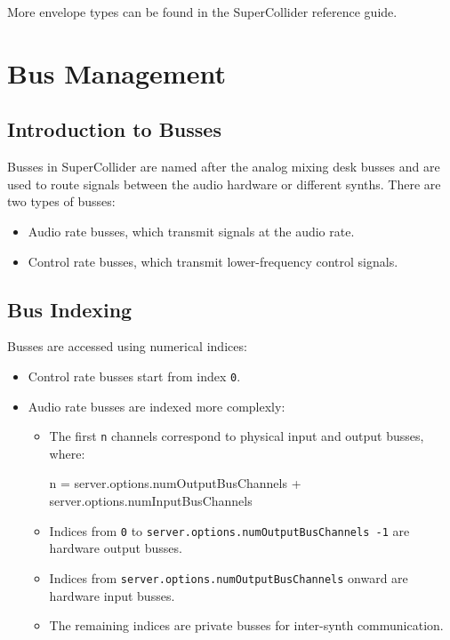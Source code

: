 More envelope types can be found in the SuperCollider reference guide.

\section{Bus Management}

\subsection{Introduction to Busses}

Busses in SuperCollider are named after the analog mixing desk busses and are used to route signals between the audio hardware or different synths. There are two types of busses:

\begin{itemize}
    \item Audio rate busses, which transmit signals at the audio rate.
    \item Control rate busses, which transmit lower-frequency control signals.
\end{itemize}

\subsection{Bus Indexing}

Busses are accessed using numerical indices:

\begin{itemize}
    \item Control rate busses start from index \texttt{0}.
    \item Audio rate busses are indexed more complexly:
    
    \begin{itemize}
        \item The first \texttt{n} channels correspond to physical input and output busses, where:
        
        \begin{supercollider*}
        n = server.options.numOutputBusChannels + server.options.numInputBusChannels
        \end{supercollider*}
        
        \item Indices from \texttt{0} to \texttt{server.options.numOutputBusChannels -1} are hardware output busses.
        \item Indices from \texttt{server.options.numOutputBusChannels} onward are hardware input busses.
        \item The remaining indices are private busses for inter-synth communication.
    \end{itemize}
\end{itemize}

